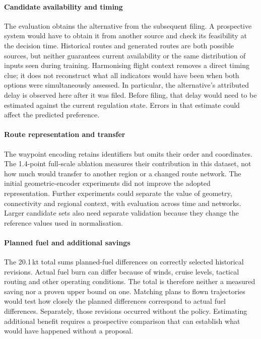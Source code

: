\documentclass[preprint,authoryear,12pt]{elsarticle}
\begin{document}
\paragraph{Candidate availability and timing}
The evaluation obtains the alternative from the subsequent filing.
A prospective system would have to obtain it from another source and
check its feasibility at the decision time. Historical routes and
generated routes are both possible sources, but neither guarantees
current availability or the same distribution of inputs seen during
training. Harmonising flight context removes a direct timing clue;
it does not reconstruct what all indicators would have been when
both options were simultaneously assessed. In particular, the
alternative's attributed delay is observed here after it was filed.
Before filing, that delay would need to be estimated against the
current regulation state. Errors in that estimate could affect the
predicted preference.

\paragraph{Route representation and transfer}
The waypoint encoding retains identifiers but omits their order and
coordinates. The 1.4-point full-scale ablation measures their contribution
in this dataset, not how much would transfer to another region or a
changed route network. The initial geometric-encoder experiments did
not improve the adopted representation. Further experiments could
separate the value of geometry, connectivity and regional context,
with evaluation across time and networks. Larger candidate sets also
need separate validation because they change the reference values
used in normalisation.

\paragraph{Planned fuel and additional savings}
The 20.1\,kt total sums planned-fuel differences on correctly selected
historical revisions. Actual fuel burn can differ because of winds,
cruise levels, tactical routing and other operating conditions. The
total is therefore neither a measured saving nor a proven upper bound
on one. Matching plans to flown trajectories would test how closely
the planned differences correspond to actual fuel differences.
Separately, those revisions occurred without the policy. Estimating
additional benefit requires a prospective comparison that can
establish what would have happened without a proposal.
\end{document}
